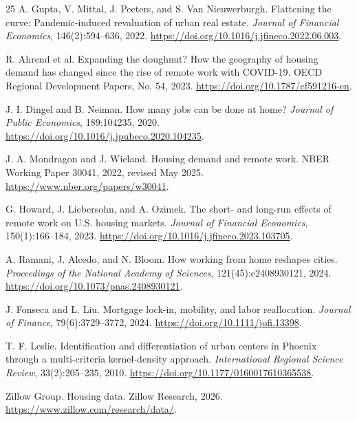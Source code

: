 \documentclass[11pt]{article}
\begin{document}
\begin{thebibliography}{25}
A. Gupta, V. Mittal, J. Peeters, and S. Van Nieuwerburgh.
\newblock Flattening the curve: Pandemic-induced revaluation of urban real estate.
\newblock \emph{Journal of Financial Economics}, 146(2):594--636, 2022.
\newblock \url{https://doi.org/10.1016/j.jfineco.2022.06.003}.

R. Ahrend et al.
\newblock Expanding the doughnut? How the geography of housing demand has changed since the rise of remote work with COVID-19.
\newblock OECD Regional Development Papers, No. 54, 2023.
\newblock \url{https://doi.org/10.1787/cf591216-en}.

J. I. Dingel and B. Neiman.
\newblock How many jobs can be done at home?
\newblock \emph{Journal of Public Economics}, 189:104235, 2020.
\newblock \url{https://doi.org/10.1016/j.jpubeco.2020.104235}.

J. A. Mondragon and J. Wieland.
\newblock Housing demand and remote work.
\newblock NBER Working Paper 30041, 2022, revised May 2025.
\newblock \url{https://www.nber.org/papers/w30041}.

G. Howard, J. Liebersohn, and A. Ozimek.
\newblock The short- and long-run effects of remote work on U.S. housing markets.
\newblock \emph{Journal of Financial Economics}, 150(1):166--184, 2023.
\newblock \url{https://doi.org/10.1016/j.jfineco.2023.103705}.

A. Ramani, J. Alcedo, and N. Bloom.
\newblock How working from home reshapes cities.
\newblock \emph{Proceedings of the National Academy of Sciences}, 121(45):e2408930121, 2024.
\newblock \url{https://doi.org/10.1073/pnas.2408930121}.

J. Fonseca and L. Liu.
\newblock Mortgage lock-in, mobility, and labor reallocation.
\newblock \emph{Journal of Finance}, 79(6):3729--3772, 2024.
\newblock \url{https://doi.org/10.1111/jofi.13398}.

T. F. Leslie.
\newblock Identification and differentiation of urban centers in Phoenix through a multi-criteria kernel-density approach.
\newblock \emph{International Regional Science Review}, 33(2):205--235, 2010.
\newblock \url{https://doi.org/10.1177/0160017610365538}.

Zillow Group.
\newblock Housing data.
\newblock Zillow Research, 2026. \url{https://www.zillow.com/research/data/}.


\end{thebibliography}
\end{document}
